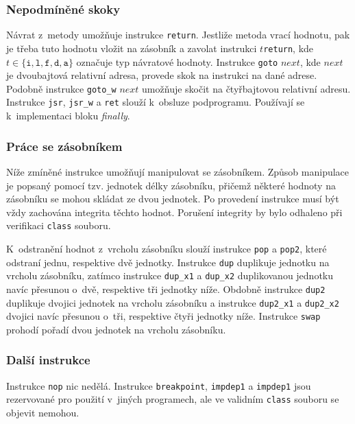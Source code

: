 \subsubsection {Nepodmíněné skoky}

Návrat z~metody umožňuje instrukce \texttt{return}. Jestliže metoda vrací hodnotu, pak je třeba tuto hodnotu vložit na zásobník a zavolat instrukci $t$\texttt{return}, kde $t \in \{ \texttt{i}, \texttt{l}, \texttt{f}, \texttt{d}, \texttt{a} \}$ označuje typ návratové hodnoty. 
Instrukce \texttt{goto} $next$, kde $next$ je dvoubajtová relativní adresa, provede skok na instrukci na dané adrese. Podobně instrukce \texttt{goto\_w} $next$ umožňuje skočit na čtyřbajtovou relativní adresu.
Instrukce \texttt{jsr}, \texttt{jsr\_w} a \texttt{ret} slouží k~obsluze podprogramu. Používají se k~implementaci bloku \textit{finally}.

\subsubsection{Práce se zásobníkem}

Níže zmíněné instrukce umožňují manipulovat se zásobníkem. Způsob manipulace je popsaný pomocí tzv. jednotek délky zásobníku, přičemž některé hodnoty na zásobníku se mohou skládat ze dvou jednotek. Po provedení instrukce musí být vždy zachována integrita těchto hodnot. Porušení integrity by bylo odhaleno při verifikaci \texttt{class} souboru.

K~odstranění hodnot z~vrcholu zásobníku slouží instrukce \texttt{pop} a \texttt{pop2}, které odstraní jednu, respektive dvě jednotky. Instrukce \texttt{dup} duplikuje jednotku na vrcholu zásobníku, zatímco instrukce \texttt{dup\_x1} a \texttt{dup\_x2} duplikovanou jednotku navíc přesunou o~dvě, respektive tři jednotky níže. Obdobně instrukce \texttt{dup2} duplikuje dvojici jednotek na vrcholu zásobníku a instrukce \texttt{dup2\_x1} a \texttt{dup2\_x2} dvojici navíc přesunou o~tři, respektive čtyři jednotky níže. Instrukce 
\texttt{swap} prohodí pořadí dvou jednotek na vrcholu zásobníku.

\subsubsection{Další instrukce}

Instrukce \texttt{nop} nic nedělá. Instrukce \texttt{breakpoint}, \texttt{impdep1} a \texttt{impdep1} jsou rezervované pro použití v~jiných programech, ale ve validním \texttt{class} souboru se objevit nemohou.

